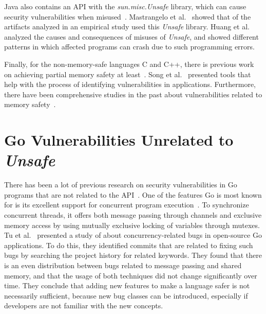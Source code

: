 Java also contains an \unsafe{} API with the \textit{sun.misc.Unsafe} library, which can cause security vulnerabilities
when misused~\cite{mastrangelo2019}.
Mastrangelo et al.~\cite{mastrangelo2015} showed that  of the artifacts analyzed in an empirical study
used this \textit{Unsafe} library.
Huang et al.~\cite{huang2019} analyzed the causes and consequences of misuses of \textit{Unsafe}, and showed different
patterns in which affected programs can crash due to such programming errors.

Finally, for the non-memory-safe languages C and C++, there is previous work on achieving partial memory safety at
least~\cite{burow2018, nagarakatte2009}.
Song et al.~\cite{song2019} presented tools that help with the process of identifying vulnerabilities in applications.
Furthermore, there have been comprehensive studies in the past about vulnerabilities related to memory
safety~\cite{szekeres2013,alnaeli2017,larochelle2001}.



\section{Go Vulnerabilities Unrelated to \textit{Unsafe}}\label{sec:related-work:other-go-vulnerabilities}

There has been a lot of previous research on security vulnerabilities in Go programs that are not related to the
\unsafe{} \acrshort{API}~\cite{zhou2017, hill2002, hannan1998, choi1999}.
One of the features Go is most known for is its excellent support for concurrent program execution~\cite{donovan2015}.
To synchronize concurrent threads, it offers both message passing through channels and exclusive memory access by using
mutually exclusive locking of variables through mutexes.
Tu et al.~\cite{tu2019} presented a study of about  concurrency-related bugs in  open-source
Go applications.
To do this, they identified commits that are related to fixing such bugs by searching the project history for related
keywords.
They found that there is an even distribution between bugs related to message passing and shared memory, and that the
usage of both techniques did not change significantly over time.
They conclude that adding new features to make a language safer is not necessarily sufficient, because new bug classes
can be introduced, especially if developers are not familiar with the new concepts.

